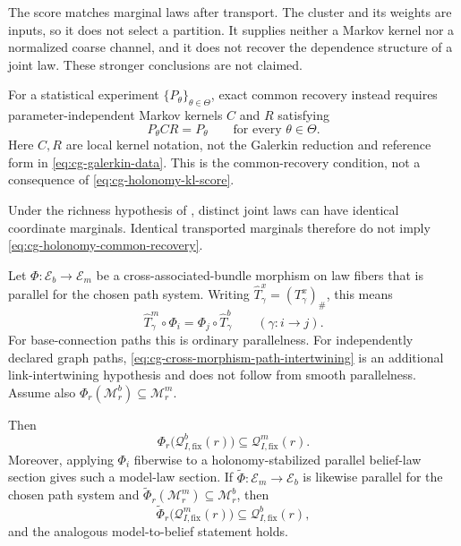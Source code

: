 The score matches marginal laws after transport. The cluster and its weights
are inputs, so it does not select a partition. It supplies neither a Markov
kernel nor a normalized coarse channel, and it does not recover the
dependence structure of a joint law. These stronger conclusions are not
claimed. 

For a statistical experiment
\(\{P_\theta\}_{\theta\in\Theta}\), exact common recovery instead requires
parameter-independent Markov kernels \(C\) and \(R\) satisfying
\begin{equation}
P_\theta C R=P_\theta
\qquad\text{for every }\theta\in\Theta.
\label{eq:cg-holonomy-common-recovery}
\end{equation}
Here \(C,R\) are local kernel notation, not the Galerkin reduction and
reference form in \eqref{eq:cg-galerkin-data}.
This is the common-recovery condition, not a consequence of
\eqref{eq:cg-holonomy-kl-score}. 

Under the richness
hypothesis of , distinct
joint laws can have identical coordinate marginals. Identical transported
marginals therefore do not imply \eqref{eq:cg-holonomy-common-recovery}.

Let \(\Phi:\mathcal E_b\to\mathcal E_m\) be a cross-associated-bundle
morphism on law fibers that is parallel for the chosen path system. Writing
\(\widehat T_\gamma^x=(T_\gamma^x)_\#\), this means
\begin{equation}
\widehat T_\gamma^m\circ\Phi_i
=\Phi_j\circ\widehat T_\gamma^b
\qquad(\gamma:i\to j).
\label{eq:cg-cross-morphism-path-intertwining}
\end{equation}
For base-connection paths this is ordinary parallelness. For independently
declared graph paths, \eqref{eq:cg-cross-morphism-path-intertwining} is an
additional link-intertwining hypothesis and does not follow from smooth
parallelness. Assume also
\(\Phi_r(\mathscr M_r^b)\subseteq\mathscr M_r^m\).

Then
\begin{equation}
\Phi_r\bigl(\mathscr Q_{I,\mathrm{fix}}^b(r)\bigr)
\subseteq\mathscr Q_{I,\mathrm{fix}}^m(r).
\label{eq:cg-phi-holonomy-fixed}
\end{equation}
Moreover, applying \(\Phi_i\) fiberwise to a holonomy-stabilized parallel
belief-law section gives such a model-law section. If
\(\widetilde\Phi:\mathcal E_m\to\mathcal E_b\) is likewise parallel for the
chosen path system and
\(\widetilde\Phi_r(\mathscr M_r^m)\subseteq\mathscr M_r^b\), then
\begin{equation}
\widetilde\Phi_r\bigl(\mathscr Q_{I,\mathrm{fix}}^m(r)\bigr)
\subseteq\mathscr Q_{I,\mathrm{fix}}^b(r),
\label{eq:cg-tildephi-holonomy-fixed}
\end{equation}
and the analogous model-to-belief statement holds. 

